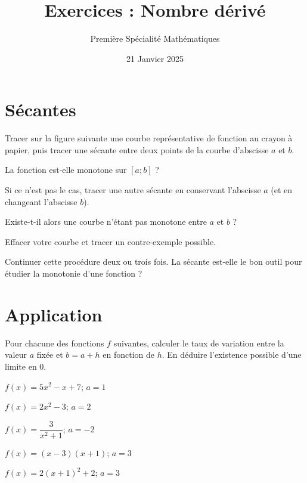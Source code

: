 \documentclass{article}
\title{Exercices : Nombre dérivé}
\author{Première Spécialité Mathématiques}
\date{21 Janvier 2025}
\begin{document}
\maketitle
\section{Sécantes}
Tracer sur la figure suivante une courbe représentative de fonction au crayon à papier, puis tracer une sécante entre deux points de la courbe d'abscisse $a$ et $b$.

La fonction est-elle monotone sur $[a;b]$ ?

Si ce n'est pas le cas, tracer une autre sécante en conservant l'abscisse $a$ (et en changeant l'abscisse $b$).

Existe-t-il alors une courbe n'étant pas monotone entre $a$ et $b$ ? 

Effacer votre courbe et tracer un contre-exemple possible.

Continuer cette procédure deux ou trois fois. La sécante est-elle le bon outil pour étudier la monotonie d'une fonction ?
\begin{center}
\end{center}
\section{Application}
\begin{tcolorbox}
Pour chacune des fonctions $f$ suivantes, calculer le taux de variation entre la valeur $a$ fixée et $b = a+h$ en fonction de $h$. En déduire l'existence possible d'une limite en $0$.
\end{tcolorbox}
\begin{enumquestions}
\item $f(x) = 5x^2-x+7$; $a = 1$
\item $f(x) = 2x^2-3$; $a = 2$
\item $f(x) = \dfrac{3}{x^2 + 1}$; $a = -2$
\item $f(x) = (x-3)(x+1)$; $a = 3$
\item $f(x) = 2(x+1)^2+2$; $a = 3$
\end{enumquestions}
\end{document}
